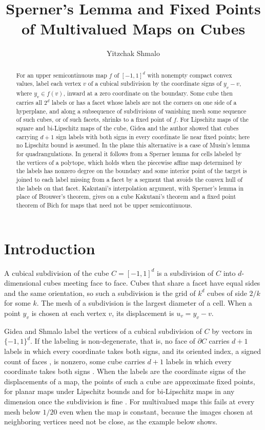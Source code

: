 \documentclass[11pt]{amsart}
\title[Sperner's lemma and multivalued fixed points]{Sperner's Lemma and Fixed Points of Multivalued Maps on Cubes}
\author[Yitzchak Shmalo]{Yitzchak Shmalo}
\theoremstyle{definition}
\theoremstyle{remark}
\numberwithin{equation}{section}
\begin{document}
\begin{abstract}
For an upper semicontinuous map $f$ of $[-1,1]^d$ with nonempty compact convex values, label each vertex $v$ of a cubical subdivision by the coordinate signs of $y_v-v$, where $y_v\in f(v)$, inward at a zero coordinate on the boundary. Some cube then carries all $2^d$ labels or has a facet whose labels are not the corners on one side of a hyperplane, and along a subsequence of subdivisions of vanishing mesh some sequence of such cubes, or of such facets, shrinks to a fixed point of $f$. For Lipschitz maps of the square and bi-Lipschitz maps of the cube, Gidea and the author showed that cubes carrying $d+1$ sign labels with both signs in every coordinate lie near fixed points; here no Lipschitz bound is assumed. In the plane this alternative is a case of Musin's lemma for quadrangulations. In general it follows from a Sperner lemma for cells labeled by the vertices of a polytope, which holds when the piecewise affine map determined by the labels has nonzero degree on the boundary and some interior point of the target is joined to each label missing from a facet by a segment that avoids the convex hull of the labels on that facet. Kakutani's interpolation argument, with Sperner's lemma in place of Brouwer's theorem, gives on a cube Kakutani's theorem and a fixed point theorem of Bich for maps that need not be upper semicontinuous.
\end{abstract}
\maketitle

\section{Introduction}\label{sec:intro}
A cubical subdivision of the cube $C=[-1,1]^d$ is a subdivision of $C$ into $d$-dimensional cubes meeting face to face. Cubes that share a facet have equal sides and the same orientation, so such a subdivision is the grid of $k^d$ cubes of side $2/k$ for some $k$. The mesh of a subdivision is the largest diameter of a cell. When a point $y_v$ is chosen at each vertex $v$, its displacement is $u_v=y_v-v$.

Gidea and Shmalo \cite{GS1} label the vertices of a cubical subdivision of $C$ by vectors in $\{-1,1\}^d$. If the labeling is non-degenerate, that is, no face of $\partial C$ carries $d+1$ labels in which every coordinate takes both signs, and its oriented index, a signed count of faces \cite[\S2.2]{GS1}, is nonzero, some cube carries $d+1$ labels in which every coordinate takes both signs \cite[Theorem~3.4]{GS1}. When the labels are the coordinate signs of the displacements of a map, the points of such a cube are approximate fixed points, for planar maps under Lipschitz bounds \cite[Proposition~4.6]{GS1} and for bi-Lipschitz maps in any dimension once the subdivision is fine \cite[Proposition~4.10]{GS1}. For multivalued maps this fails at every mesh below $1/20$ even when the map is constant, because the images chosen at neighboring vertices need not be close, as the example below shows.
\end{document}
